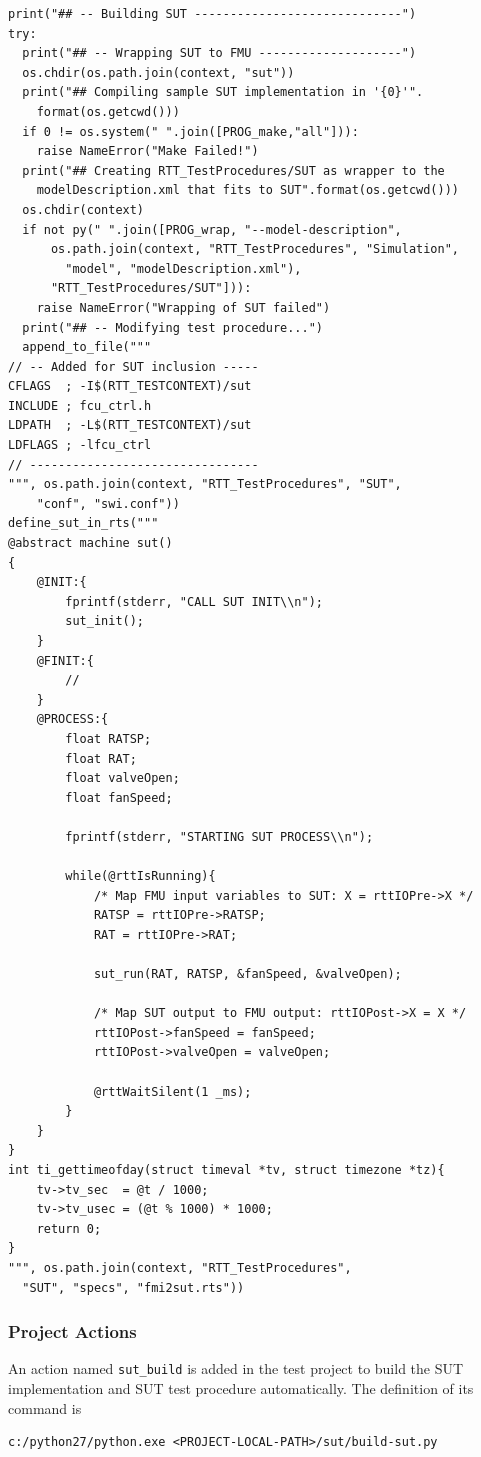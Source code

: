 \begin{lstlisting}
print("## -- Building SUT -----------------------------")
try:
  print("## -- Wrapping SUT to FMU --------------------")
  os.chdir(os.path.join(context, "sut"))
  print("## Compiling sample SUT implementation in '{0}'".
    format(os.getcwd()))
  if 0 != os.system(" ".join([PROG_make,"all"])):
    raise NameError("Make Failed!")
  print("## Creating RTT_TestProcedures/SUT as wrapper to the 
    modelDescription.xml that fits to SUT".format(os.getcwd()))
  os.chdir(context)
  if not py(" ".join([PROG_wrap, "--model-description", 
      os.path.join(context, "RTT_TestProcedures", "Simulation", 
        "model", "modelDescription.xml"), 
      "RTT_TestProcedures/SUT"])):
    raise NameError("Wrapping of SUT failed")
  print("## -- Modifying test procedure...")
  append_to_file("""
// -- Added for SUT inclusion -----
CFLAGS  ; -I$(RTT_TESTCONTEXT)/sut
INCLUDE ; fcu_ctrl.h
LDPATH  ; -L$(RTT_TESTCONTEXT)/sut 
LDFLAGS ; -lfcu_ctrl
// --------------------------------
""", os.path.join(context, "RTT_TestProcedures", "SUT", 
    "conf", "swi.conf"))
define_sut_in_rts("""
@abstract machine sut()
{					   
	@INIT:{			   
		fprintf(stderr, "CALL SUT INIT\\n");
		sut_init();						   
	}									   
	@FINIT:{							   
		//
	}
	@PROCESS:{
		float RATSP;
		float RAT;
		float valveOpen;
		float fanSpeed;

		fprintf(stderr, "STARTING SUT PROCESS\\n");

		while(@rttIsRunning){
			/* Map FMU input variables to SUT: X = rttIOPre->X */
			RATSP = rttIOPre->RATSP;
			RAT = rttIOPre->RAT;

			sut_run(RAT, RATSP, &fanSpeed, &valveOpen);

			/* Map SUT output to FMU output: rttIOPost->X = X */
			rttIOPost->fanSpeed = fanSpeed;
			rttIOPost->valveOpen = valveOpen;

			@rttWaitSilent(1 _ms);
		}
	}
}
int ti_gettimeofday(struct timeval *tv, struct timezone *tz){
	tv->tv_sec	= @t / 1000;		  
	tv->tv_usec = (@t % 1000) * 1000;
	return 0; 
}
""", os.path.join(context, "RTT_TestProcedures", 
  "SUT", "specs", "fmi2sut.rts"))
\end{lstlisting}

\subsubsection{Project Actions}
An action named \verb+sut_build+ is added in the test project to build the SUT implementation and SUT test procedure automatically. The definition of its command is
\begin{verbatim}
c:/python27/python.exe <PROJECT-LOCAL-PATH>/sut/build-sut.py
\end{verbatim}

